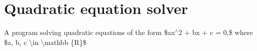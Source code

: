 \chapter{Quadratic equation solver}
\hypertarget{md__r_e_a_d_m_e}{}\label{md__r_e_a_d_m_e}
\label{md__r_e_a_d_m_e_autotoc_md0}%
%
 A program solving quadratic equations of the form \$ax\texorpdfstring{$^\wedge$}{\string^}2 + bx + c = 0,\$ where \$a, b, c \textbackslash{}in \textbackslash{}mathbb \{R\}\$ 